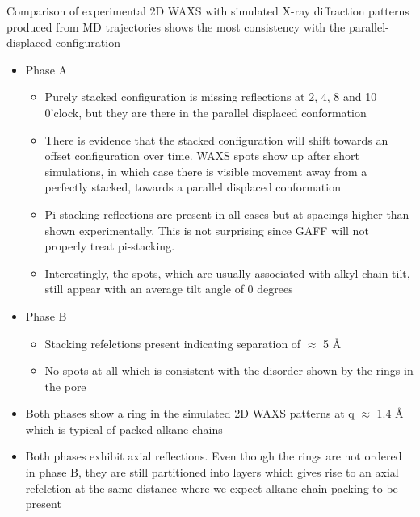 \documentclass{article}
\newcommand{\angstrom}{\textup{\AA}}
\begin{document}
\begin{itemize}
	Comparison of experimental 2D WAXS with simulated X-ray diffraction patterns produced from MD trajectories shows the most consistency with the parallel-displaced configuration
	\begin{itemize}
		\item Phase A
		\begin{itemize}	
			\item Purely stacked configuration is missing reflections at 2, 4, 8 and 10 0'clock, but they are there in the parallel displaced conformation
			\item There is evidence that the stacked configuration will shift towards an offset configuration over time. WAXS spots show up after short simulations, in which case there is visible movement away from a perfectly stacked, towards a parallel displaced conformation 
			\item Pi-stacking reflections are present in all cases but at spacings higher than shown experimentally. This is not surprising since GAFF will not properly treat pi-stacking.
			\item Interestingly, the spots, which are usually associated with alkyl chain tilt, still appear with an average tilt angle of 0 degrees
		\end{itemize}
		\item Phase B
		\begin{itemize}
			\item Stacking refelctions present indicating separation of $\approx$ 5 \angstrom
			\item No spots at all which is consistent with the disorder shown by the rings in the pore
		\end{itemize}
		\item Both phases show a ring in the simulated 2D WAXS patterns at q $\approx$ 1.4 \angstrom{} which is typical of packed alkane chains
		\item Both phases exhibit axial reflections. Even though the rings are not ordered in phase B, they are still partitioned into layers which gives rise to an axial refelction at the same distance where we expect alkane chain packing to be present   
	\end{itemize} 


\end{itemize}
\end{document}
